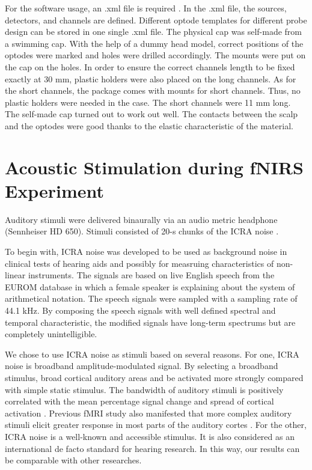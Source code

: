 For the software usage, an .xml file is required . In the .xml file, the sources, detectors, and channels are defined. Different optode templates for different probe design can be stored in one single .xml file. The physical cap was self-made from a swimming cap. With the help of a dummy head model, correct positions of the optodes were marked and holes were drilled accordingly. The mounts were put on the cap on the holes. In order to ensure the correct channels length to be fixed exactly at 30 mm, plastic holders were also placed on the long channels. As for the short channels, the  package comes with mounts for short channels. Thus, no plastic holders were needed in the case. The short channels were 11 mm long. The self-made cap turned out to work out well. The contacts between the scalp and the optodes were good thanks to the elastic characteristic of the material.



\section {Acoustic Stimulation during fNIRS Experiment}
Auditory stimuli were delivered binaurally via an audio metric headphone (Sennheiser HD 650). Stimuli consisted of 20-s chunks of the ICRA noise \cite {Dreschler}. 

To begin with, ICRA noise was developed to be used as background noise in clinical tests of hearing aids and possibly for measruing characteristics of non-linear instruments. The signals are based on live English speech from the EUROM database \cite {chanEUROM} in which a female speaker is explaining about the system of arithmetical notation. The speech signals were sampled with a sampling rate of 44.1 kHz. By composing the speech signals with well defined spectral and temporal characteristic, the modified signals have long-term spectrums but are completely unintelligible. 
 
We chose to use ICRA noise as stimuli based on several reasons. For one, ICRA noise is broadband amplitude-modulated signal. By selecting a broadband stimulus, broad cortical auditory areas and be activated more strongly compared with simple static stimulus. The bandwidth of auditory stimuli is positively correlated with the mean percentage signal change and spread of cortical activation \cite {Hall}. Previous fMRI study also manifested that more complex auditory stimuli elicit greater response in most parts of the auditory cortes \cite {Belin}. For the other, ICRA noise is a well-known and accessible stimulus. It is also considered as an international de facto standard for hearing research. In this way, our results can be comparable with other researches.
 

